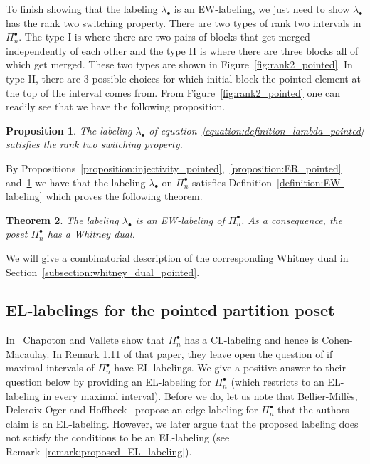 \documentclass[11pt]{article}
\newtheorem{theo}{Theorem}[section]
\newtheorem{prop}[theo]{Proposition}
\theoremstyle{definition}
\numberwithin{equation}{section}
\begin{document}
To finish showing that the labeling $\lambda_{\bullet}$ is an EW-labeling, we just need to show $\lambda_\bullet$ has the rank two switching property. There are two types of rank two intervals in $\Pi_n^\bullet$.   The type I is where there are two pairs of blocks that get merged independently of each other and the type II is where there are three blocks all of which get merged. These two types are shown in Figure~\ref{fig:rank2_pointed}. In type II, there are 3 possible choices for which initial block the pointed element at the top of the interval comes from.  From Figure~\ref{fig:rank2_pointed} one can readily see that we have the following proposition. 

\begin{prop}\label{proposition:rank_two-pointed}
The labeling $\lambda_{\bullet}$ of equation~\eqref{equation:definition_lambda_pointed} satisfies the rank two switching property.
\end{prop}


By Propositions~\ref{proposition:injectivity_pointed},~\ref{proposition:ER_pointed} and~\ref{proposition:rank_two-pointed} we have that the labeling $\lambda_{\bullet}$ on $\Pi_n^{\bullet}$ satisfies Definition~\ref{definition:EW-labeling} which proves the following theorem.

\begin{theo}\label{theorem:EW-pointed}
The labeling $\lambda_{\bullet}$ is an EW-labeling of $\Pi_{n}^{\bullet}$. As a consequence, the poset $\Pi_{n}^{\bullet}$ has a Whitney dual.
\end{theo}


We will give a combinatorial description of the corresponding Whitney dual in Section~\ref{subsection:whitney_dual_pointed}.



\subsection{EL-labelings for the pointed partition poset}\label{section:El-labeling_pointed_partition}

In~\cite[Theorem 1.11]{ChapotonVallete2006} Chapoton and Vallete show that $\Pi_n^\bullet$ has a CL-labeling and hence is Cohen-Macaulay.   In Remark 1.11 of that paper, they  leave open the question of if  maximal intervals of $\Pi_n^\bullet$  have  EL-labelings.    We give a positive answer to their question below by providing an EL-labeling for $\Pi_n^\bullet$ (which restricts to an EL-labeling in every maximal interval). Before we do, let us note that Bellier-Mill{\`e}s, Delcroix-Oger and Hoffbeck~\cite[Proposition 3.13]{BelliermillesDelcroixogerHoffbeck2021} propose an edge labeling for $\Pi_n^{\bullet}$ that the authors claim is an EL-labeling. However, we later argue that the proposed labeling does not satisfy the conditions to be an EL-labeling (see Remark~\ref{remark:proposed_EL_labeling}). 
\end{document}
